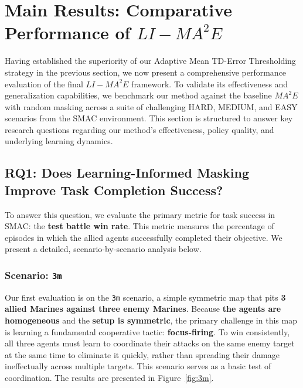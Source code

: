 \section{Main Results: Comparative Performance of $LI-{MA}^2E$}
\label{sec:main_results}

Having established the superiority of our Adaptive Mean TD-Error Thresholding strategy in the previous section, we now present a comprehensive performance evaluation of the final $LI-{MA}^2E$ framework. To validate its effectiveness and generalization capabilities, we benchmark our method against the baseline ${MA}^2E$ with random masking across a suite of challenging HARD, MEDIUM, and EASY scenarios from the SMAC environment. This section is structured to answer key research questions regarding our method's effectiveness, policy quality, and underlying learning dynamics.

\subsection{RQ1: Does Learning-Informed Masking Improve Task Completion Success?}

To answer this question, we evaluate the primary metric for task success in SMAC: the \textbf{test battle win rate}. This metric measures the percentage of episodes in which the allied agents successfully completed their objective. We present a detailed, scenario-by-scenario analysis below.
\subsubsection{Scenario: \texttt{3m}}
Our first evaluation is on the \texttt{3m} scenario, a simple symmetric map that pits \textbf{3 allied Marines against three enemy Marines}. Because  \textbf{the agents are homogeneous} and the \textbf{setup is symmetric}, the primary challenge in this map is learning a fundamental cooperative tactic: \textbf{focus-firing}. To win consistently, all three agents must learn to coordinate their attacks on the same enemy target at the same time to eliminate it quickly, rather than spreading their damage ineffectually across multiple targets. This scenario serves as a basic test of coordination. The results are presented in Figure~\ref{fig:3m}.

